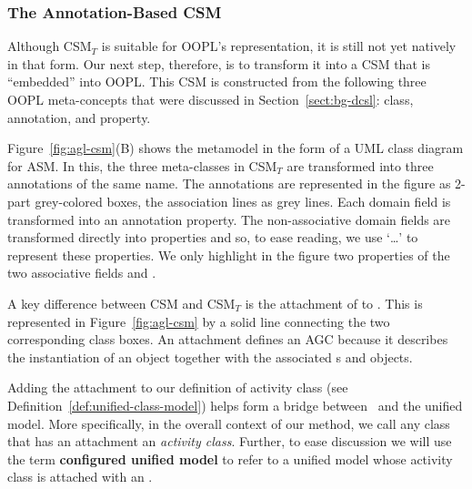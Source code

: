 \subsubsection{The Annotation-Based CSM}
\label{sect:agl-csm}

Although CSM$_T$ is suitable for OOPL's representation, it is still not yet natively in that form. Our next step, therefore, is to transform it into a CSM that is ``embedded'' into OOPL. This CSM is constructed from the following three OOPL meta-concepts that were discussed in Section~\ref{sect:bg-dcsl}: class, annotation, and property.


Figure~\ref{fig:agl-csm}(B) shows the metamodel in the form of a UML class diagram for ASM. In this, the three meta-classes in CSM$_T$ are transformed into three annotations of the same name. The annotations are represented in the figure as 2-part grey-colored boxes, the association lines as grey lines. Each domain field is transformed into an annotation property. The non-associative domain fields are transformed directly into properties and so, to ease reading, we use `\dots' to represent these properties. We only highlight in the figure two properties of the two associative fields  and . 

A key difference between CSM and CSM$_T$ is the attachment of  to . This is represented in Figure~\ref{fig:agl-csm} by a solid line connecting the two corresponding class boxes. An  attachment defines an AGC because it describes the instantiation of an  object together with the associated s and  objects.

Adding the  attachment to our definition of activity class (see Definition~\ref{def:unified-class-model}) helps form a bridge between \agl~and the unified model. More specifically, in the overall context of our method, we call any class that has an  attachment an \textit{activity class}.
Further, to ease discussion we will use the term \textbf{configured unified model} to refer to a unified model whose activity class is attached with an . 
%
